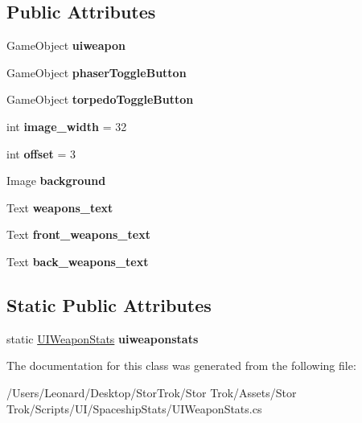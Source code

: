 \subsection*{Public Attributes}
\begin{DoxyCompactItemize}
\item 
\mbox{\label{class_u_i_weapon_stats_a82b7e899646962bd41d73f9b879ab23c}} 
Game\+Object {\bfseries uiweapon}
\item 
\mbox{\label{class_u_i_weapon_stats_a30c47b23ba712359d4419810f3f094e6}} 
Game\+Object {\bfseries phaser\+Toggle\+Button}
\item 
\mbox{\label{class_u_i_weapon_stats_a5b286d6438b1413a03ed65bcb3d2ba79}} 
Game\+Object {\bfseries torpedo\+Toggle\+Button}
\item 
\mbox{\label{class_u_i_weapon_stats_ab68bfd07d9f8fce2573d2f12f039904f}} 
int {\bfseries image\+\_\+width} = 32
\item 
\mbox{\label{class_u_i_weapon_stats_adedff92643906bca1b6ecba3bc63169e}} 
int {\bfseries offset} = 3
\item 
\mbox{\label{class_u_i_weapon_stats_a8b1341dc46b5484ca44c470f61f0b800}} 
Image {\bfseries background}
\item 
\mbox{\label{class_u_i_weapon_stats_a6ada8e06e4a5139cff9e186e3890cc02}} 
Text {\bfseries weapons\+\_\+text}
\item 
\mbox{\label{class_u_i_weapon_stats_a32eb5893c186c3838e46c34ba2ec75e0}} 
Text {\bfseries front\+\_\+weapons\+\_\+text}
\item 
\mbox{\label{class_u_i_weapon_stats_a04e9387ce914d8f1b6e7968578e09cd2}} 
Text {\bfseries back\+\_\+weapons\+\_\+text}
\end{DoxyCompactItemize}
\subsection*{Static Public Attributes}
\begin{DoxyCompactItemize}
\item 
\mbox{\label{class_u_i_weapon_stats_ac4347118eda075ff155fe746d2059cef}} 
static \hyperlink{class_u_i_weapon_stats}{U\+I\+Weapon\+Stats} {\bfseries uiweaponstats}
\end{DoxyCompactItemize}


The documentation for this class was generated from the following file\+:\begin{DoxyCompactItemize}
\item 
/\+Users/\+Leonard/\+Desktop/\+Stor\+Trok/\+Stor Trok/\+Assets/\+Stor Trok/\+Scripts/\+U\+I/\+Spaceship\+Stats/U\+I\+Weapon\+Stats.\+cs\end{DoxyCompactItemize}
